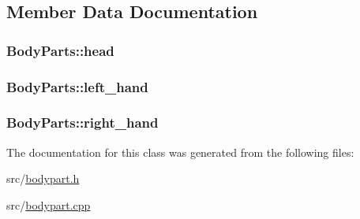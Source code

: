 \subsection{Member Data Documentation}
\hypertarget{class_body_parts_a4639c1a935a64333ef1658c1a320f4a7}{
\subsubsection[{head}]{ {\bf BodyParts::head}}}
\label{class_body_parts_a4639c1a935a64333ef1658c1a320f4a7}
\hypertarget{class_body_parts_ad8764fe7847e709d38dab525b83e3825}{
\subsubsection[{left\_\-hand}]{ {\bf BodyParts::left\_\-hand}}}
\label{class_body_parts_ad8764fe7847e709d38dab525b83e3825}
\hypertarget{class_body_parts_a92eb5e818287c46c6125872f9e504ad5}{
\subsubsection[{right\_\-hand}]{ {\bf BodyParts::right\_\-hand}}}
\label{class_body_parts_a92eb5e818287c46c6125872f9e504ad5}


The documentation for this class was generated from the following files:\begin{DoxyCompactItemize}
\item 
src/\hyperlink{bodypart_8h}{bodypart.h}\item 
src/\hyperlink{bodypart_8cpp}{bodypart.cpp}\end{DoxyCompactItemize}
